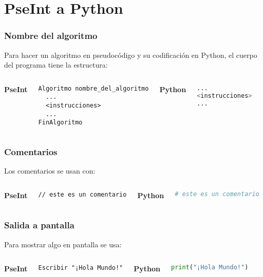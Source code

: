 
\section{PseInt a Python}

\begin{frame}[fragile]
  \frametitle{Nombre del algoritmo}

  Para hacer un algoritmo en pseudocódigo y su codificación en Python,
  el cuerpo del programa tiene la estructura:
  \vspace{\baselineskip}
  \begin{columns}
      \textbf{PseInt}
      \begin{lstlisting}[style=pseudocodigo]
Algoritmo nombre_del_algoritmo
  ...
  <instrucciones>
  ...
FinAlgoritmo
      \end{lstlisting}
    \pausa
      \textbf{Python}
      \begin{lstlisting}[language=Python]
...
<instrucciones>
...

      \end{lstlisting}
  \end{columns}
\end{frame}

\begin{frame}[fragile]
  \frametitle{Comentarios}

  Los comentarios se usan con:
  \vspace{\baselineskip}
  \begin{columns}
      \textbf{PseInt}
      \begin{lstlisting}[style=pseudocodigo]
// este es un comentario
      \end{lstlisting}
    \pausa
      \textbf{Python}
      \begin{lstlisting}[language=Python]
# este es un comentario
      \end{lstlisting}
  \end{columns}
\end{frame}

\begin{frame}[fragile]
  \frametitle{Salida a pantalla}

  Para mostrar algo en pantalla se usa:
  \vspace{\baselineskip}
  \begin{columns}
      \textbf{PseInt}
      \begin{lstlisting}[style=pseudocodigo]
Escribir "¡Hola Mundo!"
      \end{lstlisting}
    \pausa
      \textbf{Python}
      \begin{lstlisting}[language=Python]
print("¡Hola Mundo!")
      \end{lstlisting}
  \end{columns}
\end{frame}

